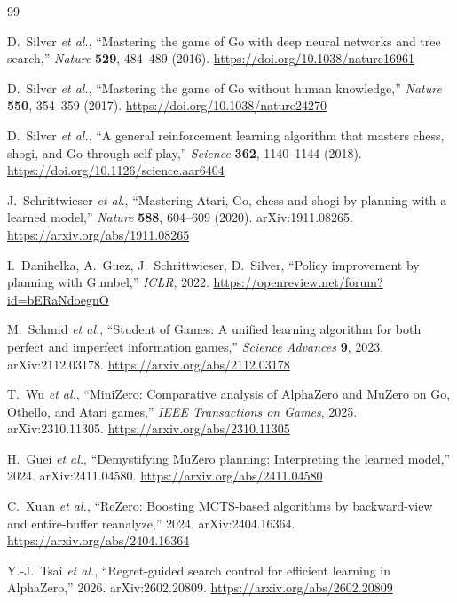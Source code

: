 \documentclass[11pt]{article}
\begin{document}
\begin{thebibliography}{99}
\small

 D.~Silver \emph{et al.},
  ``Mastering the game of Go with deep neural networks and tree search,''
  \emph{Nature} \textbf{529}, 484--489 (2016).
  \url{https://doi.org/10.1038/nature16961}

 D.~Silver \emph{et al.},
  ``Mastering the game of Go without human knowledge,''
  \emph{Nature} \textbf{550}, 354--359 (2017).
  \url{https://doi.org/10.1038/nature24270}

 D.~Silver \emph{et al.},
  ``A general reinforcement learning algorithm that masters chess, shogi, and Go through
  self-play,'' \emph{Science} \textbf{362}, 1140--1144 (2018).
  \url{https://doi.org/10.1126/science.aar6404}

 J.~Schrittwieser \emph{et al.},
  ``Mastering Atari, Go, chess and shogi by planning with a learned model,''
  \emph{Nature} \textbf{588}, 604--609 (2020). arXiv:1911.08265.
  \url{https://arxiv.org/abs/1911.08265}

 I.~Danihelka, A.~Guez, J.~Schrittwieser, D.~Silver,
  ``Policy improvement by planning with Gumbel,'' \emph{ICLR}, 2022.
  \url{https://openreview.net/forum?id=bERaNdoegnO}

 M.~Schmid \emph{et al.},
  ``Student of Games: A unified learning algorithm for both perfect and imperfect
  information games,'' \emph{Science Advances} \textbf{9}, 2023. arXiv:2112.03178.
  \url{https://arxiv.org/abs/2112.03178}

 T.~Wu \emph{et al.},
  ``MiniZero: Comparative analysis of AlphaZero and MuZero on Go, Othello, and Atari
  games,'' \emph{IEEE Transactions on Games}, 2025. arXiv:2310.11305.
  \url{https://arxiv.org/abs/2310.11305}

 H.~Guei \emph{et al.},
  ``Demystifying MuZero planning: Interpreting the learned model,'' 2024.
  arXiv:2411.04580. \url{https://arxiv.org/abs/2411.04580}

 C.~Xuan \emph{et al.},
  ``ReZero: Boosting MCTS-based algorithms by backward-view and entire-buffer reanalyze,''
  2024. arXiv:2404.16364. \url{https://arxiv.org/abs/2404.16364}

 Y.-J.~Tsai \emph{et al.},
  ``Regret-guided search control for efficient learning in AlphaZero,'' 2026.
  arXiv:2602.20809. \url{https://arxiv.org/abs/2602.20809}


\end{thebibliography}
\end{document}
